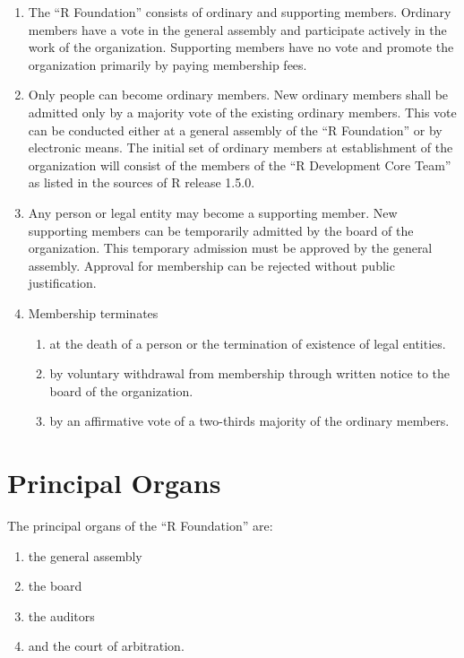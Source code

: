 \documentclass[a4paper]{article}
\newcommand{\RF}{``R Foundation''}
\begin{document}
\begin{enumerate}
 \item The \RF{} consists of ordinary and supporting
  members.  Ordinary members have a vote in the general assembly and
  participate actively in the work of the organization. Supporting
  members have no vote and promote the organization primarily by
  paying membership fees.
  
 \item Only people can become ordinary members. New ordinary
  members shall be admitted only by a majority vote of the existing
  ordinary members. This vote can be conducted either at a general
  assembly of the \RF{} or by electronic means.  The
  initial set of ordinary members at establishment of the organization
  will consist of the members of the ``R Development Core Team'' as
  listed in the sources of R release 1.5.0.
  
 \item Any person or legal entity may become a supporting member.  New
  supporting members can be temporarily admitted by the board of the
  organization.  This temporary admission must be approved by the
  general assembly.  Approval for membership can be rejected without
  public justification.

 \item Membership terminates
  \begin{enumerate}
   \item at the death of a person or the termination of
    existence of legal entities.
   \item by voluntary withdrawal from membership through written
    notice to the board of the organization.
   \item by an affirmative vote of a two-thirds majority of the
    ordinary members. 
  \end{enumerate}
\end{enumerate}
   

\section{Principal Organs}

The principal organs of the \RF{} are: 
\begin{enumerate}
 \item the general assembly
 \item the board
 \item the auditors
 \item and the court of arbitration.
\end{enumerate}
\end{document}
